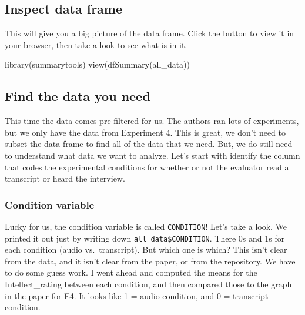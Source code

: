 \documentclass[
]{book}
\newenvironment{Shaded}{\begin{snugshade}}{\end{snugshade}}
\newcommand{\FunctionTok}[1]{\textcolor[rgb]{0.00,0.00,0.00}{#1}}
\newcommand{\NormalTok}[1]{#1}
\newcommand{\SpecialCharTok}[1]{\textcolor[rgb]{0.00,0.00,0.00}{#1}}
\begin{document}
\hypertarget{inspect-data-frame}{%
\subsection{Inspect data frame}\label{inspect-data-frame}}

This will give you a big picture of the data frame. Click the button to view it in your browser, then take a look to see what is in it.

\begin{Shaded}
\begin{Highlighting}[]
\FunctionTok{library}\NormalTok{(summarytools)}
\FunctionTok{view}\NormalTok{(}\FunctionTok{dfSummary}\NormalTok{(all\_data))}
\end{Highlighting}
\end{Shaded}

\hypertarget{find-the-data-you-need}{%
\subsection{Find the data you need}\label{find-the-data-you-need}}

This time the data comes pre-filtered for us. The authors ran lots of experiments, but we only have the data from Experiment 4. This is great, we don't need to subset the data frame to find all of the data that we need. But, we do still need to understand what data we want to analyze. Let's start with identify the column that codes the experimental conditions for whether or not the evaluator read a transcript or heard the interview.

\hypertarget{condition-variable}{%
\subsubsection{Condition variable}\label{condition-variable}}

Lucky for us, the condition variable is called \texttt{CONDITION}! Let's take a look. We printed it out just by writing down \texttt{all\_data\$CONDITION}. There 0s and 1s for each condition (audio vs.~transcript). But which one is which? This isn't clear from the data, and it isn't clear from the paper, or from the repository. We have to do some guess work. I went ahead and computed the means for the Intellect\_rating between each condition, and then compared those to the graph in the paper for E4. It looks like 1 = audio condition, and 0 = transcript condition.

\begin{Shaded}
\end{Shaded}
\end{document}
